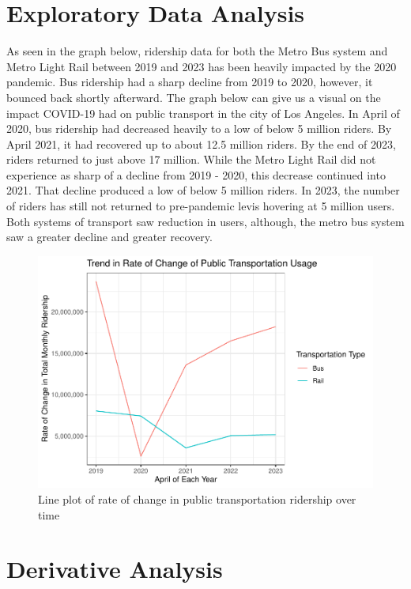\documentclass[
]{article}
\begin{document}
\hypertarget{exploratory-data-analysis}{%
\section{Exploratory Data Analysis}\label{exploratory-data-analysis}}

As seen in the graph below, ridership data for both the Metro Bus system
and Metro Light Rail between 2019 and 2023 has been heavily impacted by
the 2020 pandemic. Bus ridership had a sharp decline from 2019 to 2020,
however, it bounced back shortly afterward. The graph below can give us
a visual on the impact COVID-19 had on public transport in the city of
Los Angeles. In April of 2020, bus ridership had decreased heavily to a
low of below 5 million riders. By April 2021, it had recovered up to
about 12.5 million riders. By the end of 2023, riders returned to just
above 17 million. While the Metro Light Rail did not experience as sharp
of a decline from 2019 - 2020, this decrease continued into 2021. That
decline produced a low of below 5 million riders. In 2023, the number of
riders has still not returned to pre-pandemic levis hovering at 5
million users. Both systems of transport saw reduction in users,
although, the metro bus system saw a greater decline and greater
recovery.

\begin{figure}
\centering
\includegraphics{Paper_files/figure-latex/rate-of-change-plot-1.pdf}
\caption{Line plot of rate of change in public transportation ridership
over time}
\end{figure}

\newpage

\hypertarget{derivative-analysis}{%
\section{Derivative Analysis}\label{derivative-analysis}}
\end{document}
